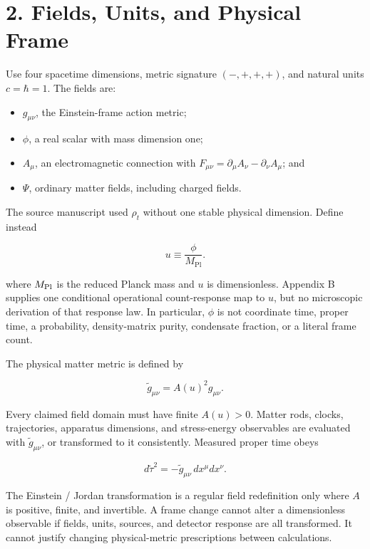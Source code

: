 \documentclass[
  american,
  11pt,
  letterpaper,
]{article}
\providecommand{\tightlist}{%
  \setlength{\itemsep}{0pt}\setlength{\parskip}{0pt}}
\begin{document}
\section{2. Fields, Units, and Physical Frame}\label{fields-units-and-physical-frame}

Use four spacetime dimensions, metric signature \((-,+,+,+)\), and natural units \(c=\hbar=1\). The fields are:

\begin{itemize}
\tightlist
\item
  \(g_{\mu\nu}\), the Einstein-frame action metric;
\item
  \(\phi\), a real scalar with mass dimension one;
\item
  \(A_\mu\), an electromagnetic connection with \(F_{\mu\nu}=\partial_\mu A_\nu-\partial_\nu A_\mu\); and
\item
  \(\Psi\), ordinary matter fields, including charged fields.
\end{itemize}

The source manuscript used \(\rho_t\) without one stable physical dimension. Define instead

\begin{equation}
u \equiv \frac{\phi}{M_{\mathrm{Pl}}}.
\tag{1}
\end{equation}

where \(M_{\rm Pl}\) is the reduced Planck mass and \(u\) is dimensionless. Appendix B supplies one conditional operational count-response map to \(u\), but no microscopic derivation of that response law. In particular, \(\phi\) is not coordinate time, proper time, a probability, density-matrix purity, condensate fraction, or a literal frame count.

The physical matter metric is defined by

\begin{equation}
\widetilde g_{\mu\nu}=A(u)^2 g_{\mu\nu}.
\tag{2}
\end{equation}

Every claimed field domain must have finite \(A(u)>0\). Matter rods, clocks, trajectories, apparatus dimensions, and stress-energy observables are evaluated with \(\widetilde g_{\mu\nu}\), or transformed to it consistently. Measured proper time obeys

\begin{equation}
d\widetilde\tau^2=-\widetilde g_{\mu\nu}\,dx^\mu dx^\nu.
\tag{3}
\end{equation}

The Einstein / Jordan transformation is a regular field redefinition only where \(A\) is positive, finite, and invertible. A frame change cannot alter a dimensionless observable if fields, units, sources, and detector response are all transformed. It cannot justify changing physical-metric prescriptions between calculations.
\end{document}
